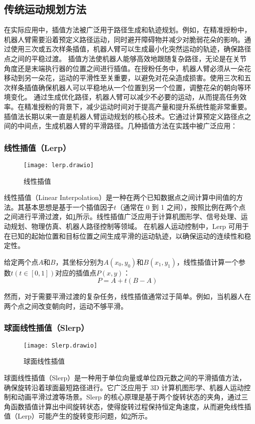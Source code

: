 \subsection{传统运动规划方法}

在实际应用中，插值方法被广泛用于路径生成和轨迹规划。例如，在精准授粉中，机器人臂需要沿着预定义路径运动，同时避开障碍物并减少对脆弱花朵的影响。通过使用三次或五次样条插值，机器人臂可以生成最小化突然运动的轨迹，确保路径点之间的平稳过渡。
插值方法使机器人能够高效地跟随复杂路径，无论是在关节角度还是末端执行器的位置之间进行插值。在授粉任务中，机器人臂必须从一朵花移动到另一朵花，运动的平滑性至关重要，以避免对花朵造成损害。使用三次和五次样条插值确保机器人可以平稳地从一个位置到另一个位置，调整花朵的朝向等环境变化。
通过生成优化路径，机器人臂可以减少不必要的运动，从而提高任务效率。在精准授粉的背景下，减少运动时间对于提高产量和提升系统性能非常重要。
插值法长期以来一直是机器人臂运动规划的核心技术。它通过计算预定义路径点之间的中间点，生成机器人臂的平滑路径。几种插值方法在实践中被广泛应用：

\subsubsection{线性插值（Lerp）}
 \begin{figure}[htb]
	\texttt{[image: lerp.drawio]}
	\caption[线性插值]{线性插值} %
	\label{fig:lerp.drawio}
\end{figure}
线性插值（Linear Interpolation）是一种在两个已知数据点之间计算中间值的方法。其基本思想是基于一个插值因子$t$（通常在 0 到 1 之间），按照比例在两个点之间进行平滑过渡，如\cref{fig:lerp.drawio}所示。线性插值广泛应用于计算机图形学、信号处理、运动规划、物理仿真、机器人路径控制等领域。
在机器人运动控制中，Lerp 可用于在已知的起始位置和目标位置之间生成平滑的运动轨迹，以确保运动的连续性和稳定性。

给定两个点$A$和$B$，其坐标分别为$A(x_{0},y_{0})$和$B(x_{1},y_{1})$，线性插值计算一个参数$t(t\in[0,1])$对应的插值点$P(x,y)$：
\begin{equation}
	\label{equ:Lerp:1}
	P=A + t(B-A)
\end{equation}

然而，对于需要平滑过渡的复杂任务，线性插值通常过于简单。例如，当机器人在两个点之间改变朝向时，运动不够平滑。
\subsubsection{球面线性插值（Slerp）} 
 \begin{figure}[htb]
	\texttt{[image: Slerp.drawio]}
	\caption[球面线性插值]{球面线性插值} %
	\label{fig:Slerp.drawio}
\end{figure}
球面线性插值（Slerp）是一种用于单位向量或单位四元数之间的平滑插值方法，确保旋转沿着球面最短路径进行。它广泛应用于 3D 计算机图形学、机器人运动控制和动画平滑过渡等场景。Slerp 的核心原理是基于两个旋转状态的夹角，通过三角函数插值计算出中间旋转状态，使得旋转过程保持恒定角速度，从而避免线性插值（Lerp）可能产生的旋转变形问题，如\cref{fig:Slerp.drawio}所示。

